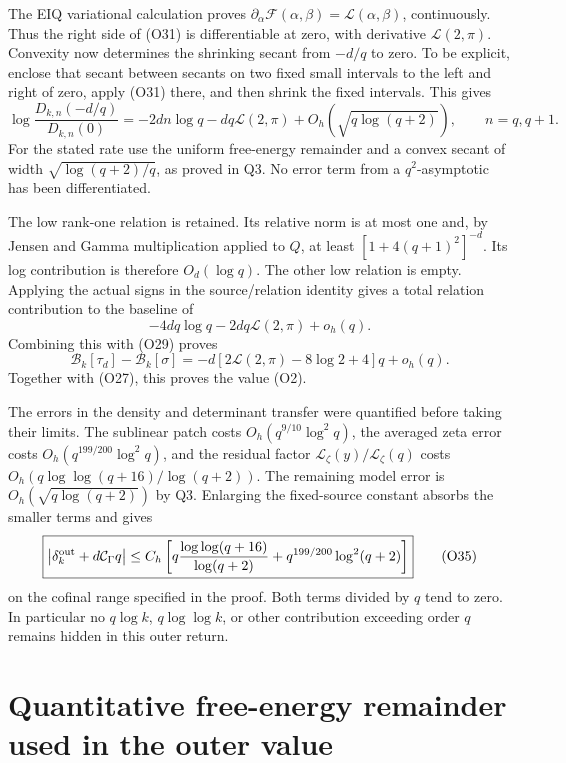 \documentclass[
  11pt,
]{article}
\begin{document}
The EIQ variational calculation proves
\(\partial_\alpha\mathcal F(\alpha,\beta)=\mathcal L(\alpha,\beta)\),
continuously. Thus the right side of (O31) is differentiable at zero,
with derivative \(\mathcal L(2,\pi)\). Convexity now determines the
shrinking secant from \(-d/q\) to zero. To be explicit, enclose that
secant between secants on two fixed small intervals to the left and
right of zero, apply (O31) there, and then shrink the fixed intervals.
This gives \[
\boxed{\log\frac{D_{k,n}(-d/q)}{D_{k,n}(0)}
=-2dn\log q-dq\mathcal L(2,\pi)+O_h(\sqrt{q\log(q+2)}),
\qquad n=q,q+1.}\tag{O33}
\] For the stated rate use the uniform free-energy remainder and a
convex secant of width \(\sqrt{\log(q+2)/q}\), as proved in Q3. No error
term from a \(q^2\)-asymptotic has been differentiated.

The low rank-one relation is retained. Its relative norm is at most one
and, by Jensen and Gamma multiplication applied to \(Q\), at least
\([1+4(q+1)^2]^{-d}\). Its log contribution is therefore
\(O_d(\log q)\). The other low relation is empty. Applying the actual
signs in the source/relation identity gives a total relation
contribution to the baseline of \[
-4dq\log q-2dq\mathcal L(2,\pi)+o_h(q).\tag{O34}
\] Combining this with (O29) proves \[
\mathcal B_k[\tau_d]-\mathcal B_k[\sigma]
=-d[2\mathcal L(2,\pi)-8\log2+4]q+o_h(q).
\] Together with (O27), this proves the value (O2).

The errors in the density and determinant transfer were quantified
before taking their limits. The sublinear patch costs
\(O_h(q^{9/10}\log^2q)\), the averaged zeta error costs
\(O_h(q^{199/200}\log^2q)\), and the residual factor
\(\mathcal L_\zeta(y)/\mathcal L_\zeta(q)\) costs
\(O_h(q\log\log(q+16)/\log(q+2))\). The remaining model error is
\(O_h(\sqrt{q\log(q+2)})\) by Q3. Enlarging the fixed-source constant
absorbs the smaller terms and gives \[
\boxed{\left|\delta_k^{\rm out}+d\mathcal C_\Gamma q\right|
\le C_h\left[
q\frac{\log\log(q+16)}{\log(q+2)}
+q^{199/200}\log^2(q+2)\right]}
\tag{O35}
\] on the cofinal range specified in the proof. Both terms divided by
\(q\) tend to zero. In particular no \(q\log k\), \(q\log\log k\), or
other contribution exceeding order \(q\) remains hidden in this outer
return.

\newpage

\section{Quantitative free-energy remainder used in the outer
value}\label{quantitative-free-energy-remainder-used-in-the-outer-value}
\end{document}
